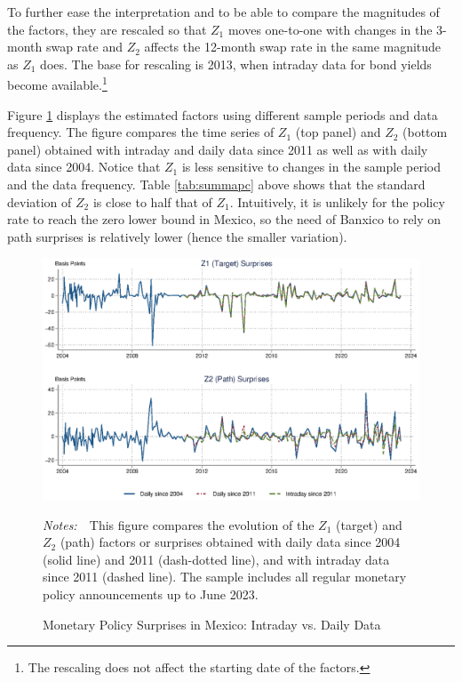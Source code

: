 \documentclass[a4paper, 12pt]{article}
\newcommand{\figtext}[1]{
	\vspace{-1ex}
	\captionsetup{justification=justified,font=footnotesize}
	\caption*{#1}
}
\newcommand{\fignotes}[1]{\figtext{\emph{Notes:~}~#1}}
\providecommand{\lastobs}{June 2023}
\providecommand{\rotated}{Z}
\providecommand{\rtdone}{\rotated_{1}}
\providecommand{\rtdtwo}{\rotated_{2}}
\begin{document}
To further ease the interpretation and to be able to compare the magnitudes of the factors, they are rescaled so that \(\rtdone\) moves one-to-one with changes in the 3-month swap rate and \(\rtdtwo\) affects the 12-month swap rate in the same magnitude as \(\rtdone\) does. 
The base for rescaling is 2013, when intraday data for bond yields become available.\footnote{ The rescaling does not affect the starting date of the factors.} 

Figure \ref{fig:factorslines} displays the estimated factors using different sample periods and data frequency. 
The figure compares the time series of \(\rtdone\) (top panel) and \(\rtdtwo\) (bottom panel) obtained with intraday and daily data since 2011 as well as with daily data since 2004. 
Notice that \(\rtdone\) is less sensitive to changes in the sample period and the data frequency. 
Table \ref{tab:summapc} above shows that the standard deviation of \(\rtdtwo\) is close to half that of \(\rtdone\). 
Intuitively, it is unlikely for the policy rate to reach the zero lower bound in Mexico, so the need of Banxico to rely on path surprises is relatively lower (hence the smaller variation).

\begin{figure}[t]
	\caption{Monetary Policy Surprises in Mexico: Intraday vs. Daily Data} \label{fig:factorslines}
	\begin{center}								%
		\begin{minipage}{0.9\linewidth}
			\vspace{-0.4cm}
			\begin{center}
				\includegraphics[width=1\textwidth,height=.4\textheight]{../Figures/factorslines.eps} \\
			\end{center}
			\vspace{-0.4cm}
			\fignotes{This figure compares the evolution of the \( \rtdone \) (target) and \( \rtdtwo \) (path) factors or surprises obtained with daily data since 2004 (solid line) and 2011 (dash-dotted line), and with intraday data since 2011 (dashed line). The sample includes all regular monetary policy announcements up to \lastobs{}.}
		\end{minipage}
	\end{center}
\end{figure}
\end{document}
